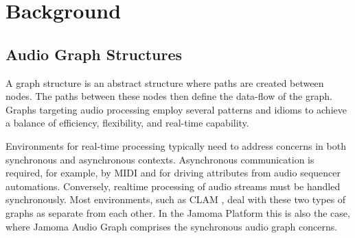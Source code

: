 \documentclass[twoside,a4paper]{article}
\begin{document}




%
\section{Background} %
%



\subsection{Audio Graph Structures} %

A graph structure is an abstract structure where paths are created between nodes. %
The paths between these nodes then define the data-flow of the graph.  
Graphs targeting audio processing employ several patterns and idioms to achieve a balance of efficiency, flexibility, and real-time capability.

Environments for real-time processing typically need to address concerns in both synchronous and asynchronous contexts.  
Asynchronous communication is required, for example, by MIDI and for driving attributes from audio sequencer automations.
Conversely, realtime processing of audio streams must be handled synchronously.  
Most environments, such as CLAM  \cite{Amatraian:2007}, deal with these two types of graphs as separate from each other.  
In the Jamoma Platform this is also the case, where Jamoma Audio Graph comprises the synchronous audio graph concerns.

\end{document}
